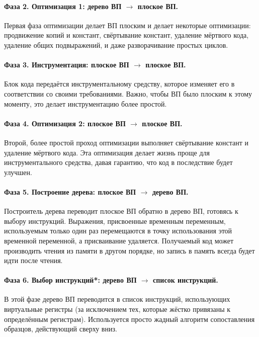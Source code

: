 \documentclass[a4paper,12pt,russian]{article}
\begin{document}
\paragraph{Фаза 2. Оптимизация 1: дерево ВП $\longrightarrow$ плоское ВП.}
Первая фаза оптимизации делает ВП плоским и делает некоторые оптимизации: продвижение копий и констант, свёртывание констант, удаление мёртвого кода, удаление общих подвыражений, и даже разворачивание простых циклов.

\paragraph{Фаза 3. Инструментация: плоское ВП $\longrightarrow$ плоское ВП.}
Блок кода передаётся инструментальному средству, которое изменяет его в соответствии со своими требованиями. Важно, чтобы ВП было плоским к этому моменту, это делает инструментацию более простой.

\paragraph{Фаза 4. Оптимизация 2: плоское ВП $\longrightarrow$ плоское ВП.}
Второй, более простой проход оптимизации выполняет свёртывание констант и удаление мёртвого кода. Эта оптимизация делает жизнь проще для инструментального средства, давая гарантию, что код в последствие будет улучшен.

\paragraph{Фаза 5. Построение дерева: плоское ВП $\longrightarrow$ дерево ВП.}
Построитель дерева переводит плоское ВП обратно в дерево ВП, готовясь к выбору инструкций. Выражения, присвоенные временным переменным, используемым только один раз перемещаются в точку использования этой временной переменной, а присваивание удаляется. Получаемый код может производить чтения из памяти в другом порядке, но запись в память всегда будет идти после чтения.

\paragraph{Фаза 6. Выбор инструкций*: дерево ВП $\longrightarrow$ список инструкций.}
В этой фазе дерево ВП переводится в список инструкций, использующих виртуальные регистры (за исключением тех, которые жёстко привязаны к определённым регистрам). Используется просто жадный алгоритм сопоставления образцов, действующий сверху вниз.
\end{document}
